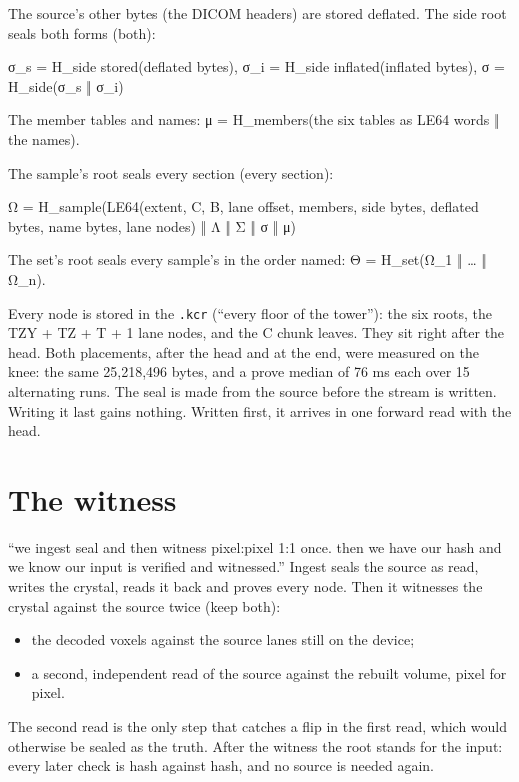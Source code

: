 The source's other bytes (the DICOM headers) are stored deflated. The side root seals both forms (both):

σ\_\allowbreak{}s = H\_\allowbreak{}side stored(deflated bytes),  σ\_\allowbreak{}i = H\_\allowbreak{}side inflated(inflated bytes),  σ = H\_\allowbreak{}side(σ\_\allowbreak{}s ‖ σ\_\allowbreak{}i)

The member tables and names: μ = H\_\allowbreak{}members(the six tables as LE64 words ‖ the names).

The sample's root seals every section (every section):

Ω = H\_\allowbreak{}sample(LE64(extent, C, B, lane offset, members, side bytes, deflated bytes, name bytes, lane nodes) ‖ Λ ‖ Σ ‖ σ ‖ μ)

The set's root seals every sample's in the order named: Θ = H\_\allowbreak{}set(Ω\_\allowbreak{}1 ‖ … ‖ Ω\_\allowbreak{}n).

Every node is stored in the \texttt{.\allowbreak{}kcr} (“every floor of the tower”): the six roots, the TZY + TZ + T + 1 lane nodes, and the C chunk leaves. They sit right after the head. Both placements, after the head and at the end, were measured on the knee: the same 25,218,496 bytes, and a prove median of 76 ms each over 15 alternating runs. The seal is made from the source before the stream is written. Writing it last gains nothing. Written first, it arrives in one forward read with the head.

\section{\texorpdfstring{The witness}{The witness}}

“we ingest seal and then witness pixel:pixel 1:1 once. then we have our hash and we know our input is verified and witnessed.” Ingest seals the source as read, writes the crystal, reads it back and proves every node. Then it witnesses the crystal against the source twice (keep both):

\begin{itemize}
\item the decoded voxels against the source lanes still on the device;
\item a second, independent read of the source against the rebuilt volume, pixel for pixel.
\end{itemize}

The second read is the only step that catches a flip in the first read, which would otherwise be sealed as the truth. After the witness the root stands for the input: every later check is hash against hash, and no source is needed again.


